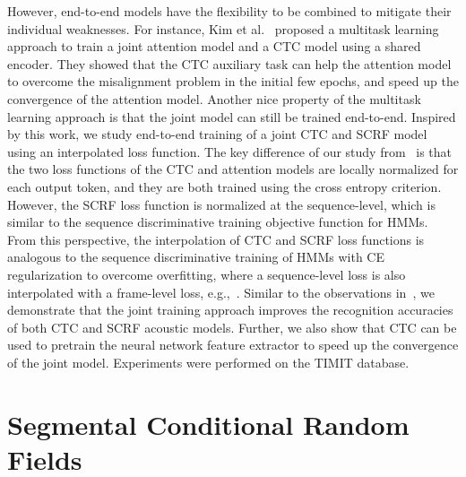 \documentclass[a4paper]{article}
\begin{document}
However, end-to-end models have the flexibility to be combined to mitigate their individual weaknesses. For instance, Kim et al.~\cite{kim2016joint} proposed a multitask learning approach to train a joint attention model and a CTC model using a shared encoder. They showed that the CTC auxiliary task can help the attention model to overcome the misalignment problem in the initial few epochs, and speed up the convergence of the attention model. Another nice property of the multitask learning approach is that the joint model can still be trained end-to-end. Inspired by this work, we study end-to-end training of a joint CTC and SCRF model using an interpolated loss function. The key difference of our study from~\cite{kim2016joint} is that the two loss functions of the CTC and attention models are locally normalized for each output token, and they are both trained using the cross entropy criterion. However, the SCRF loss function is normalized at the sequence-level, which is similar to the sequence discriminative training objective function for HMMs. From this perspective, the interpolation of CTC and SCRF loss functions is analogous to the sequence discriminative training of HMMs with CE regularization to overcome overfitting, where a sequence-level loss is also interpolated with a frame-level loss, e.g.,~\cite{su2013error}. Similar to the observations in~\cite{kim2016joint}, we demonstrate that the joint training approach improves the recognition accuracies of both CTC and SCRF acoustic models. Further, we also show that CTC can be used to pretrain the neural network feature extractor to speed up the convergence of the joint model. Experiments were performed on the TIMIT database. 

\section{Segmental Conditional Random Fields}
\label{sec:scrf}
\end{document}
